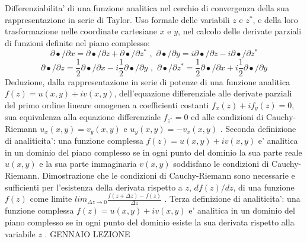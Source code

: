 \documentclass[,12pt]{article}
\begin{document}
\noindent
Differenziabilita' di una funzione analitica nel cerchio di
convergenza della sua rappresentazione in serie di Taylor. Uso formale
delle variabili $z$ e $z^\ast$, e della loro trasformazione nelle
coordinate cartesiane $x$ e $y$, nel calcolo delle derivate parziali di
funzioni definite nel piano complesso:
$$\partial \bullet/\partial x=\partial \bullet/\partial z +\partial
\bullet/\partial z^\ast \,\,,\,\,\partial \bullet/\partial y=i\partial
\bullet/\partial z-i\partial \bullet/\partial z^\ast $$
$$\partial \bullet/\partial z=\frac{1}{2}\partial \bullet/\partial x
-i\frac{1}{2}\partial
\bullet/\partial y \,\,,\,\,\partial \bullet/\partial
z^\ast=\frac{1}{2}\partial
\bullet/\partial x+i\frac{1}{2}\partial \bullet/\partial y $$
\noindent
Deduzione, dalla rappresentazione in serie di potenze di una funzione
analitica $f(z)=u(x,y)+iv(x,y)$, dell'equazione differenziale alle
derivate parziali del primo ordine lineare omogenea a coefficienti
costanti
$f_x(z)+if_y(z)=0$, sua equivalenza alla equazione differenziale
$f_{z^\ast}=0$ ed alle condizioni di Cauchy-Riemann $u_x(x,y)=v_y(x,y)$
e $u_y(x,y)=-v_x(x,y)$ . Seconda definizione di analiticita':
una funzione complessa $f(z)=u(x,y)+iv(x,y)$ e' analitica in un dominio
del piano  complesso se in ogni punto del dominio la sua parte
reale $u(x,y)$ e la sua parte immaginaria $v(x,y)$ soddisfano le
condizioni di Cauchy-Riemann. Dimostrazione che le condizioni di
Cauchy-Riemann sono necessarie e sufficienti per l'esistenza della
derivata rispetto a $z$, $df(z)/dz$, di una funzione $f(z)$ come limite 
$lim_{\Delta z
\rightarrow 0}\frac{f(z+\Delta z)-f(z)}{\Delta z}$ . Terza definizione
di analiticita': una funzione complessa $f(z)=u(x,y)+iv(x,y)$ e' analitica in un dominio
del piano  complesso se in ogni punto del dominio esiste la sua derivata
rispetto alla variabile $z$ .
\vskip 20pt
 GENNAIO
\hskip 20pt
LEZIONE
\end{document}
